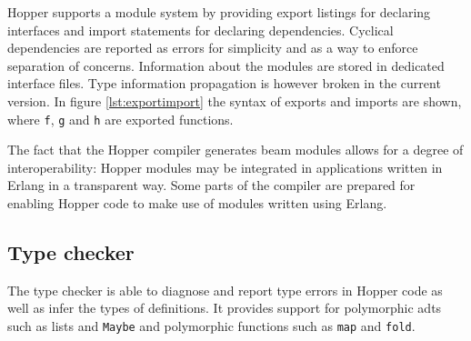 Hopper supports a module system by providing export listings for declaring interfaces and import statements for declaring dependencies. Cyclical dependencies are reported as errors for simplicity and as a way to enforce separation of concerns.
Information about the modules are stored in dedicated interface files. Type information propagation is however broken in the current version. In figure \ref{lst:exportimport} the syntax of exports and imports are shown, where \texttt{f}, \texttt{g} and \texttt{h} are exported functions.

The fact that the Hopper compiler generates \gls{beam} modules allows for a degree of interoperability: Hopper modules may be integrated in applications written in Erlang in a transparent way. Some parts of the compiler are prepared for enabling Hopper code to make use of modules written using Erlang.

\subsection{Type checker}

The type checker is able to diagnose and report type errors in Hopper code as well as infer the types of definitions.
It provides support for polymorphic \glspl{adt} such as lists and \texttt{Maybe} and polymorphic functions such as \texttt{map} and \texttt{fold}. %